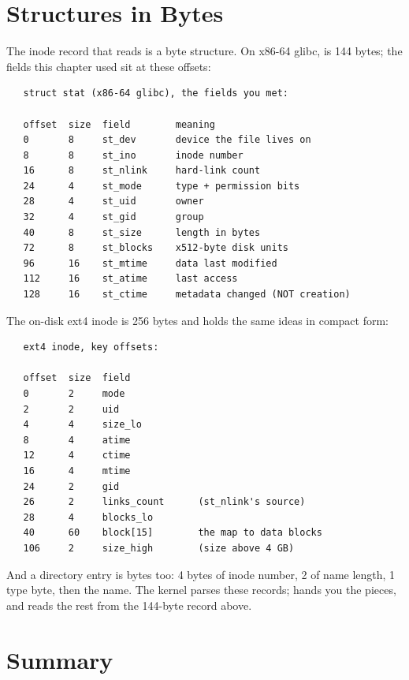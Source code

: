 \section{Structures in Bytes}

The inode record that  reads is a byte structure. On
x86-64 glibc,  is 144 bytes; the fields this chapter
used sit at these offsets:

\begin{verbatim}
   struct stat (x86-64 glibc), the fields you met:

   offset  size  field        meaning
   0       8     st_dev       device the file lives on
   8       8     st_ino       inode number
   16      8     st_nlink     hard-link count
   24      4     st_mode      type + permission bits
   28      4     st_uid       owner
   32      4     st_gid       group
   40      8     st_size      length in bytes
   72      8     st_blocks    x512-byte disk units
   96      16    st_mtime     data last modified
   112     16    st_atime     last access
   128     16    st_ctime     metadata changed (NOT creation)
\end{verbatim}

The on-disk ext4 inode is 256 bytes and holds the same ideas in
compact form:

\begin{verbatim}
   ext4 inode, key offsets:

   offset  size  field
   0       2     mode
   2       2     uid
   4       4     size_lo
   8       4     atime
   12      4     ctime
   16      4     mtime
   24      2     gid
   26      2     links_count      (st_nlink's source)
   28      4     blocks_lo
   40      60    block[15]        the map to data blocks
   106     2     size_high        (size above 4 GB)
\end{verbatim}

And a directory entry is bytes too: 4 bytes of inode number, 2 of name
length, 1 type byte, then the name. The kernel parses these records;
 hands you the pieces, and  reads the rest
from the 144-byte  record above.

\section{Summary}

